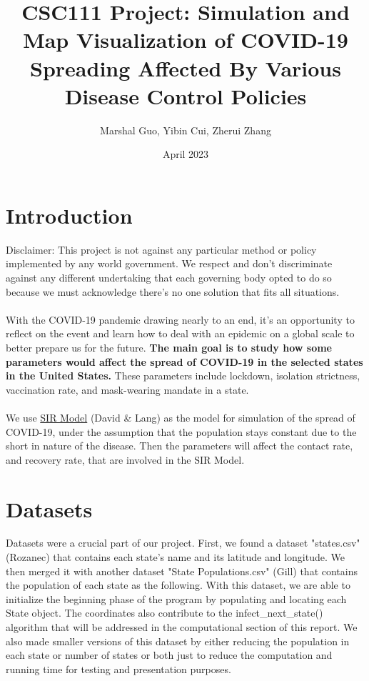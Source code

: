 \documentclass[12pt]{article}
\title{CSC111 Project: Simulation and Map Visualization of COVID-19 Spreading Affected By Various Disease Control Policies}
\author{Marshal Guo, Yibin Cui, Zherui Zhang}
\date{April 2023}
\begin{document}
\maketitle
\section{Introduction}
Disclaimer: This project is not against any particular method or policy implemented by any world government. We respect and don't discriminate against any different undertaking that each governing body opted to do so because we must acknowledge there's no one solution that fits all situations.\\\\
With the COVID-19 pandemic drawing nearly to an end, it's an opportunity to reflect on the event and learn how to deal with an epidemic on a global scale to better prepare us for the future. \textbf{The main goal is to study how some parameters would affect the spread of COVID-19 in the selected states in the United States.} These parameters include lockdown, isolation strictness, vaccination rate, and mask-wearing mandate in a state.\\\\
We use \href{https://www.maa.org/press/periodicals/loci/joma/the-sir-model-for-spread-of-disease-the-differential-equation-model}{SIR Model} (David \& Lang) as the model for simulation of the spread of COVID-19, under the assumption that the population stays constant due to the short in nature of the disease. Then the parameters will affect the contact rate, and recovery rate, that are involved in the SIR Model.
\newpage
\section{Datasets}
Datasets were a crucial part of our project. First, we found a dataset "states.csv" (Rozanec) that contains each state's name and its latitude and longitude. We then merged it with another dataset "State Populations.csv" (Gill) that contains the population of each state as the following. With this dataset, we are able to initialize the beginning phase of the program by populating and locating each State object. The coordinates also contribute to the infect\_next\_state() algorithm that will be addressed in the computational section of this report. We also made smaller versions of this dataset by either reducing the population in each state or number of states or both just to reduce the computation and running time for testing and presentation purposes.
\end{document}
